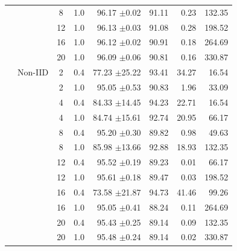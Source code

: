 \begin{table}[htbp]
{\begin{tabular}{llccrrrr}
 &  & 8 & 1.0 & 96.17 {\tiny $\pm$0.02} & 91.11 & 0.23 & 132.35 \\
 &  & 12 & 1.0 & 96.13 {\tiny $\pm$0.03} & 91.08 & 0.28 & 198.52 \\
 &  & 16 & 1.0 & 96.12 {\tiny $\pm$0.02} & 90.91 & 0.18 & 264.69 \\
 &  & 20 & 1.0 & 96.09 {\tiny $\pm$0.06} & 90.81 & 0.16 & 330.87 \\
 & Non-IID & 2 & 0.4 & 77.23 {\tiny $\pm$25.22} & 93.41 & 34.27 & 16.54 \\
 &  & 2 & 1.0 & 95.05 {\tiny $\pm$0.53} & 90.83 & 1.96 & 33.09 \\
 &  & 4 & 0.4 & 84.33 {\tiny $\pm$14.45} & 94.23 & 22.71 & 16.54 \\
 &  & 4 & 1.0 & 84.74 {\tiny $\pm$15.61} & 92.74 & 20.95 & 66.17 \\
 &  & 8 & 0.4 & 95.20 {\tiny $\pm$0.30} & 89.82 & 0.98 & 49.63 \\
 &  & 8 & 1.0 & 85.98 {\tiny $\pm$13.66} & 92.88 & 18.93 & 132.35 \\
 &  & 12 & 0.4 & 95.52 {\tiny $\pm$0.19} & 89.23 & 0.01 & 66.17 \\
 &  & 12 & 1.0 & 95.61 {\tiny $\pm$0.18} & 89.47 & 0.03 & 198.52 \\
 &  & 16 & 0.4 & 73.58 {\tiny $\pm$21.87} & 94.73 & 41.46 & 99.26 \\
 &  & 16 & 1.0 & 95.05 {\tiny $\pm$0.41} & 88.24 & 0.11 & 264.69 \\
 &  & 20 & 0.4 & 95.43 {\tiny $\pm$0.25} & 89.14 & 0.09 & 132.35 \\
 &  & 20 & 1.0 & 95.48 {\tiny $\pm$0.24} & 89.14 & 0.02 & 330.87 \\
\bottomrule
\end{tabular}%
}
\end{table}

